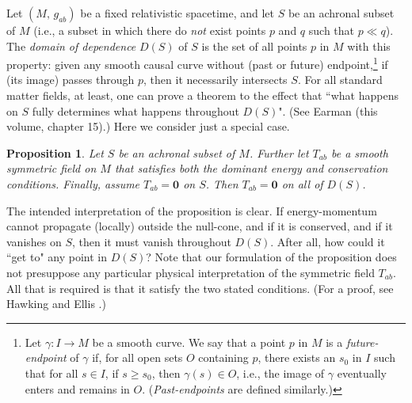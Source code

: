 \documentclass [12] {article}
\theoremstyle{plain}
\newtheorem{proposition}{Proposition}[subsection]
\numberwithin{figure}{subsection}
\numberwithin{proposition}{subsection}
\begin{document}
	Let $(M, \,   g_{ab})$  be a  fixed relativistic spacetime, and let $S$ be an achronal subset of $M$ (i.e., a subset in which there do \emph{not} exist points $p$ and $q$ such that $p\ll q$).
The \emph{domain of dependence} $D(S)$ of $S$ is the set of all points $p$ in $M$ with this property: given any smooth causal curve without (past or future) endpoint,\footnote{Let  $\gamma:I \rightarrow  M$ be a smooth curve. We say that a point $p$ in $M$ is a \emph{future-endpoint} of $\gamma$ if, for all open sets $O$ containing $p$, there exists an $s_0$ in $I$ such that for all $s \in I$, if $s \ge s_0$, then $\gamma(s) \in O$, i.e.,  the image of $\gamma$ eventually enters and remains in $O$. (\emph{Past-endpoints} are defined similarly.)} if (its image) passes through $p$, then it necessarily intersects $S$. %
%   
\noindent  For all standard matter fields, at least, one can prove a theorem to the effect that ``what happens on $S$ fully determines what happens throughout $D(S)$". (See Earman (this volume, chapter 15).) Here we consider just a special case.

\begin{proposition} \label{energy-momentum/domain of dependence} 
Let $S$ be an achronal subset of $M$. Further let $T_{ab}$ be a smooth symmetric field on $M$ that satisfies both the dominant energy and conservation conditions. Finally, assume $T_{ab} = \mathbf{0}$ on $S$. Then $T_{ab} = \mathbf{0}$ on all of $D(S)$.
\end{proposition}

The intended interpretation of the proposition is clear.  If energy-momentum cannot propagate (locally) outside the null-cone, and if it is conserved, and if it vanishes on $S$, then it must vanish throughout $D(S)$. After all, how could it ``get to" any point in $D(S)$? Note that our formulation of the proposition does not presuppose any particular physical interpretation of the symmetric field $T_{ab}$. All that is required is that it satisfy the two stated conditions. (For a proof, see Hawking and Ellis .)
\end{document}
